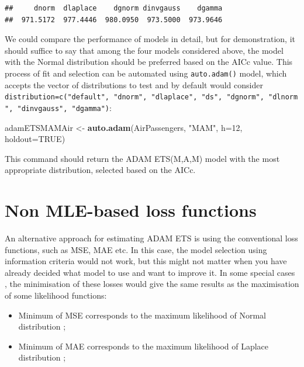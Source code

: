 \documentclass[]{book}
\newenvironment{Shaded}{\begin{snugshade}}{\end{snugshade}}
\newcommand{\DataTypeTok}[1]{\textcolor[rgb]{0.13,0.29,0.53}{#1}}
\newcommand{\DecValTok}[1]{\textcolor[rgb]{0.00,0.00,0.81}{#1}}
\newcommand{\KeywordTok}[1]{\textcolor[rgb]{0.13,0.29,0.53}{\textbf{#1}}}
\newcommand{\NormalTok}[1]{#1}
\newcommand{\OtherTok}[1]{\textcolor[rgb]{0.56,0.35,0.01}{#1}}
\newcommand{\StringTok}[1]{\textcolor[rgb]{0.31,0.60,0.02}{#1}}
\providecommand{\tightlist}{%
  \setlength{\itemsep}{0pt}\setlength{\parskip}{0pt}}
\theoremstyle{definition}
\theoremstyle{definition}
\theoremstyle{definition}
\theoremstyle{definition}
\theoremstyle{remark}
\begin{document}
\begin{verbatim}
##     dnorm  dlaplace    dgnorm dinvgauss    dgamma 
##  971.5172  977.4446  980.0950  973.5000  973.9646
\end{verbatim}

We could compare the performance of models in detail, but for demonstration, it should suffice to say that among the four models considered above, the model with the Normal distribution should be preferred based on the AICc value. This process of fit and selection can be automated using \texttt{auto.adam()} model, which accepts the vector of distributions to test and by default would consider \texttt{distribution=c("default",\ "dnorm",\ "dlaplace",\ "ds",\ "dgnorm",\ "dlnorm",\ "dinvgauss",\ "dgamma")}:

\begin{Shaded}
\begin{Highlighting}[]
\NormalTok{adamETSMAMAir <-}\StringTok{ }\KeywordTok{auto.adam}\NormalTok{(AirPassengers, }\StringTok{"MAM"}\NormalTok{, }\DataTypeTok{h=}\DecValTok{12}\NormalTok{, }\DataTypeTok{holdout=}\OtherTok{TRUE}\NormalTok{)}
\end{Highlighting}
\end{Shaded}

This command should return the ADAM ETS(M,A,M) model with the most appropriate distribution, selected based on the AICc.

\hypertarget{non-mle-based-loss-functions}{%
\section{Non MLE-based loss functions}\label{non-mle-based-loss-functions}}

An alternative approach for estimating ADAM ETS is using the conventional loss functions, such as MSE, MAE etc. In this case, the model selection using information criteria would not work, but this might not matter when you have already decided what model to use and want to improve it. In some special cases \citep[as discussed in Chapter 3 of][]{SvetunkovSBA}, the minimisation of these losses would give the same results as the maximisation of some likelihood functions:

\begin{itemize}
\tightlist
\item
  Minimum of MSE corresponds to the maximum likelihood of Normal distribution \citep[see discussion in][]{Kolassa2016};
\item
  Minimum of MAE corresponds to the maximum likelihood of Laplace distribution \citep{Schwertman1990};
\end{itemize}
\end{document}
